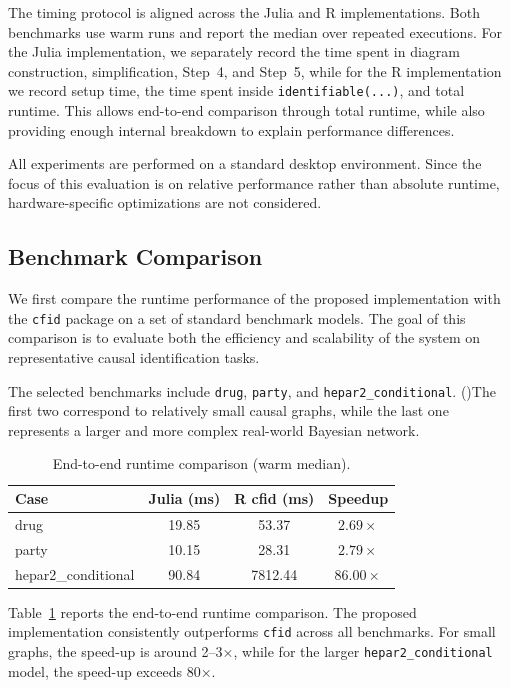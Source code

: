 \documentclass[a4paper]{report}
\begin{document}
The timing protocol is aligned across the Julia and R implementations. Both benchmarks use warm runs and report the median over repeated executions. For the Julia implementation, we separately record the time spent in diagram construction, simplification, Step~4, and Step~5, while for the R implementation we record setup time, the time spent inside \texttt{identifiable(...)}, and total runtime. This allows end-to-end comparison through total runtime, while also providing enough internal breakdown to explain performance differences.

All experiments are performed on a standard desktop environment.
Since the focus of this evaluation is on relative performance rather than absolute runtime, hardware-specific optimizations are not considered.

\subsection{Benchmark Comparison}
We first compare the runtime performance of the proposed implementation with the \texttt{cfid} package on a set of standard benchmark models. The goal of this comparison is to evaluate both the efficiency and scalability of the system on representative causal identification tasks.

The selected benchmarks include \texttt{drug}, \texttt{party}, and \texttt{hepar2\_conditional}. (\cite{scutari2010bnlearn})The first two correspond to relatively small causal graphs, while the last one represents a larger and more complex real-world Bayesian network.

\begin{table}[h]
\centering
\begin{tabular}{lccc}
\hline
Case & Julia (ms) & R cfid (ms) & Speedup \\
\hline
drug & 19.85 & 53.37 & $2.69\times$ \\
party & 10.15 & 28.31 & $2.79\times$ \\
hepar2\_conditional & 90.84 & 7812.44 & $86.00\times$ \\
\hline
\end{tabular}
\caption{End-to-end runtime comparison (warm median).}
\label{tab:runtime_total}
\end{table}

Table~\ref{tab:runtime_total} reports the end-to-end runtime comparison. The proposed implementation consistently outperforms \texttt{cfid} across all benchmarks. For small graphs, the speed-up is around 2–3×, while for the larger \texttt{hepar2\_conditional} model, the speed-up exceeds 80×.
\end{document}
